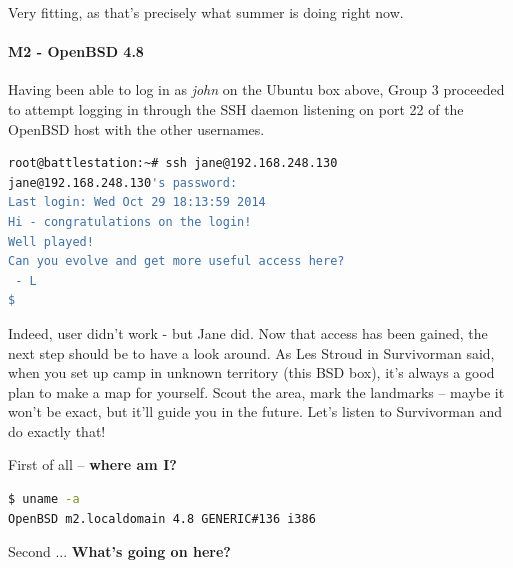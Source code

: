 Very fitting, as that's precisely what summer is doing right now.

\paragraph{M2 - OpenBSD 4.8}
Having been able to log in as \textit{john} on the Ubuntu box above, Group 3 proceeded to attempt logging in through the SSH daemon listening on port 22 of the OpenBSD host with the other usernames. 

\begin{lstlisting}[language=bash,caption={SSH'ing into OpenBSD}]
root@battlestation:~# ssh jane@192.168.248.130
jane@192.168.248.130's password: 
Last login: Wed Oct 29 18:13:59 2014
Hi - congratulations on the login!
Well played!
Can you evolve and get more useful access here?
 - L
$
\end{lstlisting}

Indeed, user didn't work - but Jane did. Now that access has been gained, the next step should be to have a look around. As Les Stroud in Survivorman said, when you set up camp in unknown territory (this BSD box), it's always a good plan to make a map for yourself. Scout the area, mark the landmarks -- maybe it won't be exact, but it'll guide you in the future. Let's listen to Survivorman and do exactly that!

First of all -- \textbf{where am I?}
\begin{lstlisting}[language=bash,caption={Where are we standing?}]
$ uname -a
OpenBSD m2.localdomain 4.8 GENERIC#136 i386
\end{lstlisting}

Second ... \textbf{What's going on here?} 

